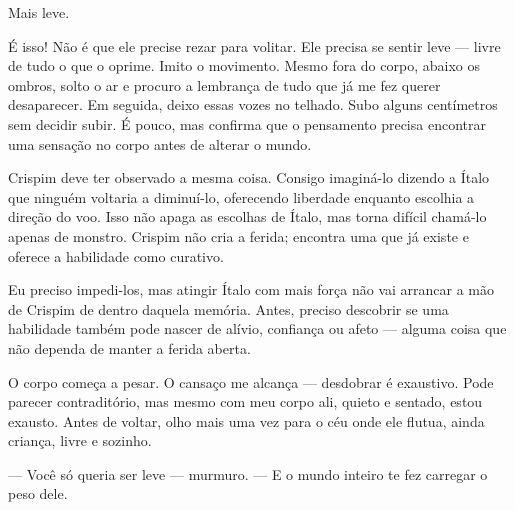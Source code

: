 Mais leve.

É isso!  
Não é que ele precise rezar para volitar.  
Ele precisa se sentir leve — livre de tudo o que o oprime.  
Imito o movimento. Mesmo fora do corpo, abaixo os ombros, solto o ar e procuro a lembrança de tudo que já me fez querer desaparecer. Em seguida, deixo essas vozes no telhado. Subo alguns centímetros sem decidir subir. É pouco, mas confirma que o pensamento precisa encontrar uma sensação no corpo antes de alterar o mundo.

Crispim deve ter observado a mesma coisa. Consigo imaginá-lo dizendo a Ítalo que ninguém voltaria a diminuí-lo, oferecendo liberdade enquanto escolhia a direção do voo. Isso não apaga as escolhas de Ítalo, mas torna difícil chamá-lo apenas de monstro. Crispim não cria a ferida; encontra uma que já existe e oferece a habilidade como curativo.

Eu preciso impedi-los, mas atingir Ítalo com mais força não vai arrancar a mão de Crispim de dentro daquela memória. Antes, preciso descobrir se uma habilidade também pode nascer de alívio, confiança ou afeto — alguma coisa que não dependa de manter a ferida aberta.

O corpo começa a pesar.  
O cansaço me alcança — desdobrar é exaustivo.  
Pode parecer contraditório, mas mesmo com meu corpo ali, quieto e sentado, estou exausto.  
Antes de voltar, olho mais uma vez para o céu onde ele flutua, ainda criança, livre e sozinho.  

— Você só queria ser leve — murmuro. — E o mundo inteiro te fez carregar o peso dele.
